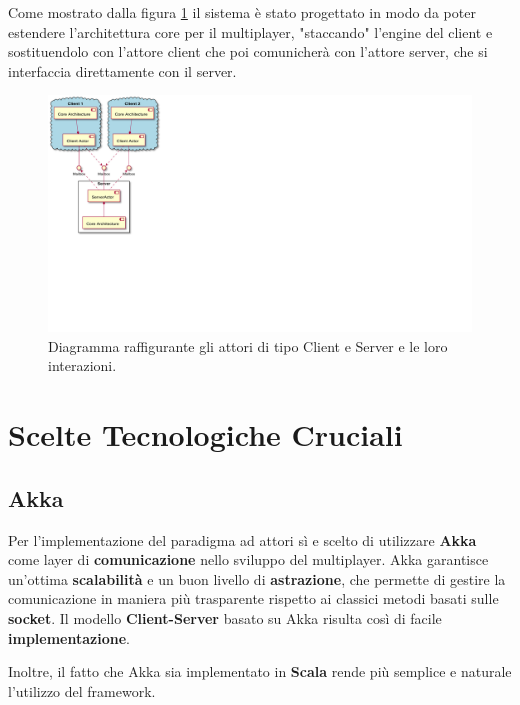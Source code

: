 Come mostrato dalla figura \ref{fig:clientServerComponentDiagram} il sistema è stato progettato in modo da poter estendere l'architettura core per il multiplayer, "staccando" l'engine del client e sostituendolo con l'attore client che poi comunicherà con l'attore server, che si interfaccia direttamente con il server.
\begin{figure}[H]
	\centering
	\includegraphics[width=0.70\columnwidth]{plantuml/rendered/componentDiagrams/clientServerComponentDiagram.pdf}
	\caption{Diagramma raffigurante gli attori di tipo Client e Server e le loro interazioni.}
	\label{fig:clientServerComponentDiagram}
\end{figure}

\section{Scelte Tecnologiche Cruciali}
    \subsection{Akka} 
        Per l'implementazione del paradigma ad attori sì e scelto di utilizzare \textbf{Akka} \cite[akkaSite]{akkaSite} come layer di \textbf{comunicazione} nello sviluppo del multiplayer. Akka garantisce un'ottima \textbf{scalabilità} e un buon livello di \textbf{astrazione}, che permette di gestire la comunicazione in maniera più trasparente rispetto ai classici metodi basati sulle \textbf{socket}. Il modello \textbf{Client-Server} basato su Akka risulta così di facile \textbf{implementazione}.
        
        Inoltre, il fatto che Akka sia implementato in \textbf{Scala} rende più semplice e naturale l'utilizzo del framework. 